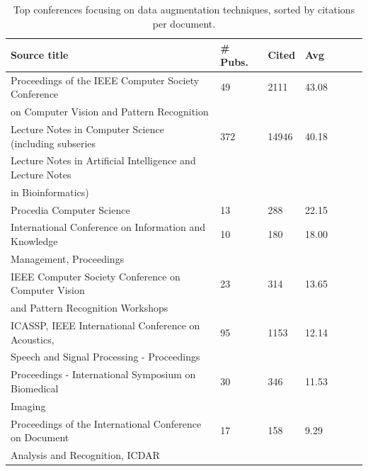 \documentclass[pdflatex,sn-mathphys]{sn-jnl}%
\theoremstyle{thmstyleone}
\theoremstyle{thmstyletwo}
\theoremstyle{thmstylethree}
\begin{document}
\begin{table}[ht]
    \begin{center}
    \caption{\label{tab:top_conferences}
        Top conferences focusing on data augmentation techniques, sorted by
        citations per document.
    }
    \begin{tabular*}{\textwidth}{@{\extracolsep{\fill}}lllllll@{\extracolsep{\fill}}}
        \toprule
        Source title & \# Pubs. & Cited & Avg \\
        \midrule
        Proceedings of the IEEE Computer Society Conference & 49 & 2111 & 43.08 \\
        \vspace{.2cm}on Computer Vision and Pattern Recognition &&& \\
        Lecture Notes in Computer Science (including subseries & 372 & 14946 & 40.18 \\
        Lecture Notes in Artificial Intelligence and Lecture Notes &&& \\ 
        \vspace{.2cm}in Bioinformatics) &&& \\

        \vspace{.2cm}Procedia Computer Science & 13 & 288 & 22.15 \\

        International Conference on Information and Knowledge & 10 & 180 & 18.00 \\
        \vspace{.2cm}Management, Proceedings &&& \\

        IEEE Computer Society Conference on Computer Vision & 23 & 314 & 13.65 \\
        \vspace{.2cm}and Pattern Recognition Workshops &&& \\

        ICASSP, IEEE International Conference on Acoustics, & 95 & 1153 & 12.14 \\
        \vspace{.2cm}Speech and Signal Processing - Proceedings &&& \\

        Proceedings - International Symposium on Biomedical & 30 & 346 & 11.53 \\
        \vspace{.2cm}Imaging &&& \\

        Proceedings of the International Conference on Document & 17 & 158 & 9.29 \\
        \vspace{.2cm}Analysis and Recognition, ICDAR &&& \\


\end{tabular*}
\end{center}
\end{table}
\end{document}
